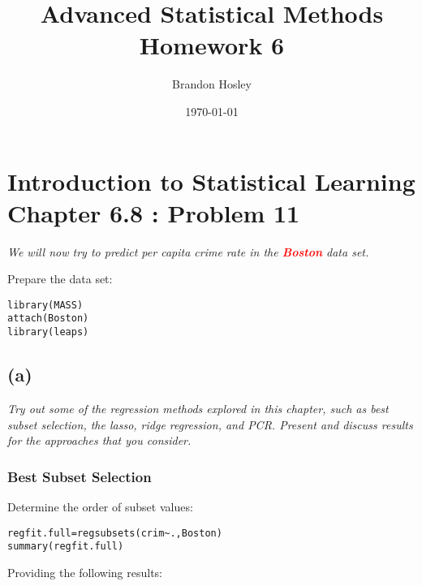 \documentclass[a4paper,man,natbib]{apa6}
\title{Advanced Statistical Methods Homework 6}
\author{Brandon Hosley}
\date{\today}
\affiliation{University of Illinois - Springfield}
\begin{document}
\maketitle
\singlespacing

\section{Introduction to Statistical Learning \\ Chapter 6.8 : Problem 11}
\emph{We will now try to predict per capita crime rate in the
	\textbf{\textcolor{red}{Boston}} data set.}

Prepare the data set:

\begin{verbatim}
library(MASS)
attach(Boston)
library(leaps)
\end{verbatim}

\subsection{(a)} 
\emph{Try out some of the regression methods explored in this chapter,
	such as best subset selection, the lasso, ridge regression, and
	PCR. Present and discuss results for the approaches that you
	consider.}

\subsubsection{Best Subset Selection} \vspace{2em}

Determine the order of subset values: \\

\begin{verbatim}
regfit.full=regsubsets(crim~.,Boston)
summary(regfit.full)
\end{verbatim}

Providing the following results: \\
\end{document}
